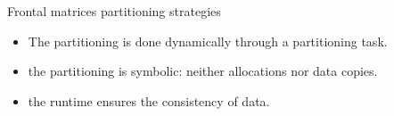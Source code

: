 \begin{frame}[fragile]{Frontal matrices partitioning strategies}


\begin{itemize}
\item The partitioning is done \alert{dynamically} through a
  \alert{partitioning task}.
\item the partitioning is \alert{symbolic}: neither allocations nor data
  copies.
\item the runtime ensures the \alert{consistency} of data.
\end{itemize}
  
\vspace{0.5cm}








\end{frame}

